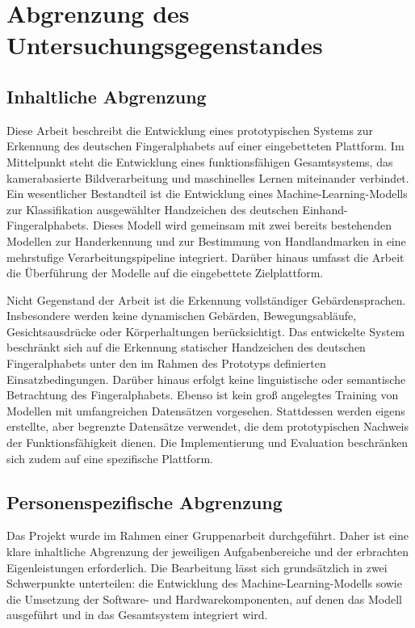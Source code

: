 \section{Abgrenzung des Untersuchungsgegenstandes}\label{sec:abgrenzung}
\subsection{Inhaltliche Abgrenzung}\label{sub:inhaltliche-abgrenzung}

Diese Arbeit beschreibt die Entwicklung eines prototypischen Systems zur Erkennung des deutschen Fingeralphabets auf einer eingebetteten Plattform. Im Mittelpunkt steht die Entwicklung eines funktionsfähigen Gesamtsystems, das kamerabasierte Bildverarbeitung und maschinelles Lernen miteinander verbindet. Ein wesentlicher Bestandteil ist die Entwicklung eines Machine-Learning-Modells zur Klassifikation ausgewählter Handzeichen des deutschen Einhand-Fingeralphabets. Dieses Modell wird gemeinsam mit zwei bereits bestehenden Modellen zur Handerkennung und zur Bestimmung von Handlandmarken in eine mehrstufige Verarbeitungspipeline integriert. Darüber hinaus umfasst die Arbeit die Überführung der Modelle auf die eingebettete Zielplattform.

Nicht Gegenstand der Arbeit ist die Erkennung vollständiger Gebärdensprachen. Insbesondere werden keine dynamischen Gebärden, Bewegungsabläufe, Gesichtsausdrücke oder Körperhaltungen berücksichtigt. Das entwickelte System beschränkt sich auf die Erkennung statischer Handzeichen des deutschen Fingeralphabets unter den im Rahmen des Prototyps definierten Einsatzbedingungen. Darüber hinaus erfolgt keine linguistische oder semantische Betrachtung des Fingeralphabets. Ebenso ist kein groß angelegtes Training von Modellen mit umfangreichen Datensätzen vorgesehen. Stattdessen werden eigens erstellte, aber begrenzte Datensätze verwendet, die dem prototypischen Nachweis der Funktionsfähigkeit dienen. Die Implementierung und Evaluation beschränken sich zudem auf eine spezifische Plattform.

\subsection{Personenspezifische Abgrenzung}\label{sub:personenspezifische-abgrenzung}

Das Projekt wurde im Rahmen einer Gruppenarbeit durchgeführt. Daher ist eine klare inhaltliche Abgrenzung der jeweiligen Aufgabenbereiche und der erbrachten Eigenleistungen erforderlich. Die Bearbeitung lässt sich grundsätzlich in zwei Schwerpunkte unterteilen: die Entwicklung des Machine-Learning-Modells sowie die Umsetzung der Software- und Hardwarekomponenten, auf denen das Modell ausgeführt und in das Gesamtsystem integriert wird.


